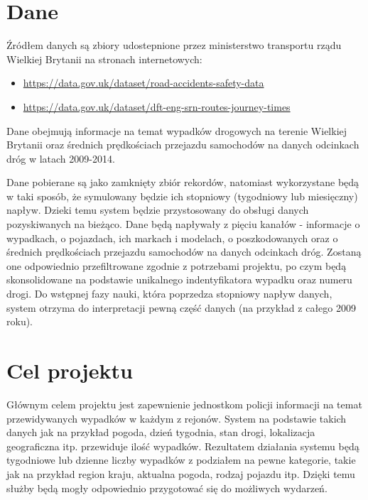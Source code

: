\documentclass{article}
\begin{document}

\section{Dane}

Źródłem danych są zbiory udostepnione przez ministerstwo transportu rządu Wielkiej Brytanii na stronach internetowych:
\begin{itemize}
    \item \url{https://data.gov.uk/dataset/road-accidents-safety-data}
    \item \url{https://data.gov.uk/dataset/dft-eng-srn-routes-journey-times}
\end{itemize}
Dane obejmują informacje na temat wypadków drogowych na terenie Wielkiej Brytanii oraz średnich prędkościach przejazdu samochodów na danych odcinkach dróg w latach 2009-2014.

Dane pobierane są jako zamknięty zbiór rekordów, natomiast wykorzystane będą w taki sposób, że symulowany będzie ich stopniowy (tygodniowy lub miesięczny) napływ. Dzieki temu system będzie przystosowany do obsługi danych pozyskiwanych na bieżąco. Dane będą napływały z pięciu kanałów - informacje o wypadkach, o pojazdach, ich markach i modelach, o poszkodowanych oraz o średnich prędkościach przejazdu samochodów na danych odcinkach dróg. Zostaną one odpowiednio przefiltrowane zgodnie z potrzebami projektu, po czym będą skonsolidowane na podstawie unikalnego indentyfikatora wypadku oraz numeru drogi. Do wstępnej fazy nauki, która poprzedza stopniowy napływ danych, system otrzyma do interpretacji pewną część danych (na przykład z całego 2009 roku).


\section{Cel projektu}

Głównym celem projektu jest zapewnienie jednostkom policji informacji na temat przewidywanych wypadków w każdym z rejonów. System na podstawie takich danych jak na przykład pogoda, dzień tygodnia, stan drogi, lokalizacja geograficzna itp. przewiduje ilość wypadków. Rezultatem działania systemu będą tygodniowe lub dzienne liczby wypadków z podziałem na pewne kategorie, takie jak na przykład region kraju, aktualna pogoda, rodzaj pojazdu itp. Dzięki temu służby będą mogły odpowiednio przygotować się do możliwych wydarzeń.
\end{document}
